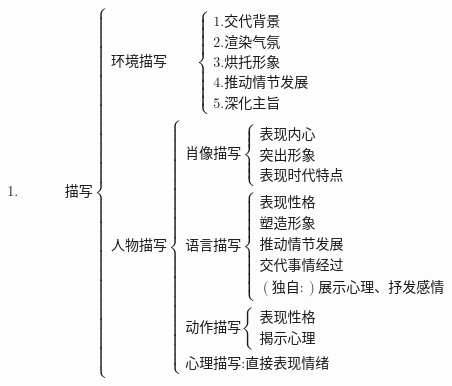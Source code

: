 \documentclass[11pt,fleqn]{article}
\begin{document}
\begin{enumerate}
\item
  $$
  \mbox{描写}
  \begin{cases}
    \mbox{环境描写} \quad \quad
    \begin{cases}
      1. \mbox{交代背景} \\
      2. \mbox{渲染气氛} \\
      3. \mbox{烘托形象} \\
      4. \mbox{推动情节发展} \\
      5. \mbox{深化主旨}
    \end{cases} \\
    \mbox{人物描写}
    \begin{cases}
      \mbox{肖像描写}
      \begin{cases}
        \mbox{表现内心} \\
        \mbox{突出形象} \\
        \mbox{表现时代特点}
      \end{cases} \\
      \mbox{语言描写}
      \begin{cases}
        \mbox{表现性格} \\
        \mbox{塑造形象} \\
        \mbox{推动情节发展} \\
        \mbox{交代事情经过} \\
        (\mbox{独自}:) \mbox{展示心理、抒发感情}
      \end{cases} \\
      \mbox{动作描写}
      \begin{cases}
        \mbox{表现性格} \\
        \mbox{揭示心理}
      \end{cases} \\
      \mbox{心理描写} : \mbox{直接表现情绪}
    \end{cases}
  \end{cases}
  $$


\end{enumerate}
\end{document}
